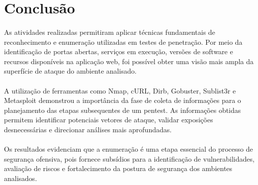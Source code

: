 \section{Conclusão}

\paragraph{}
As atividades realizadas permitiram aplicar técnicas fundamentais de
reconhecimento e enumeração utilizadas em testes de penetração. Por meio da
identificação de portas abertas, serviços em execução, versões de software e
recursos disponíveis na aplicação web, foi possível obter uma visão mais ampla
da superfície de ataque do ambiente analisado.

\paragraph{}
A utilização de ferramentas como Nmap, cURL, Dirb, Gobuster, Sublist3r e
Metasploit demonstrou a importância da fase de coleta de informações para o
planejamento das etapas subsequentes de um pentest. As informações obtidas
permitem identificar potenciais vetores de ataque, validar exposições
desnecessárias e direcionar análises mais aprofundadas.

\paragraph{}
Os resultados evidenciam que a enumeração é uma etapa essencial do processo de
segurança ofensiva, pois fornece subsídios para a identificação de
vulnerabilidades, avaliação de riscos e fortalecimento da postura de segurança
dos ambientes analisados.
